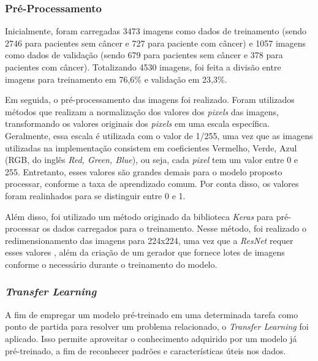 
\subsubsection{\esp Pré-Processamento} \label{preprocess}
Inicialmente, foram carregadas 3473 imagens como dados de treinamento (sendo 2746 para pacientes sem câncer e 727 para paciente com câncer) e 1057 imagens como dados de validação (sendo 679 para pacientes sem câncer e 378 para pacientes com câncer). Totalizando 4530 imagens, foi feita a divisão entre imagens para treinamento em 76,6\% e validação em 23,3\%.

Em seguida, o pré-processamento das imagens foi realizado. Foram utilizados métodos que realizam a normalização dos valores dos \textit{pixels} das imagens, transformando os valores originais dos \textit{pixels} em uma escala específica. Geralmente, essa escala é utilizada com o valor de 1/255, uma vez que as imagens utilizadas na implementação consistem em coeficientes Vermelho, Verde, Azul (RGB, do inglês \textit{Red, Green, Blue}), ou seja, cada \textit{pixel} tem um valor entre 0 e 255. Entretanto, esses valores são grandes demais para o modelo proposto processar, conforme a taxa de aprendizado comum. Por conta disso, os valores foram realinhados para se distinguir entre 0 e 1.

Além disso, foi utilizado um método originado da biblioteca \textit{Keras} para pré-processar os dados carregados para o treinamento. Nesse método, foi realizado o redimensionamento das imagens para 224x224, uma vez que a \textit{ResNet} requer esses valores \cite{kerasresnet50}, além da criação de um gerador que fornece lotes de imagens conforme o necessário durante o treinamento do modelo.


\subsubsection{\esp \textit{Transfer Learning}} \label{transfer}

A fim de empregar um modelo pré-treinado em uma determinada tarefa como ponto de partida para resolver um problema relacionado, o \textit{Transfer Learning} foi aplicado. Isso permite aproveitar o conhecimento adquirido por um modelo já pré-treinado, a fim de reconhecer padrões e características úteis nos dados. 

